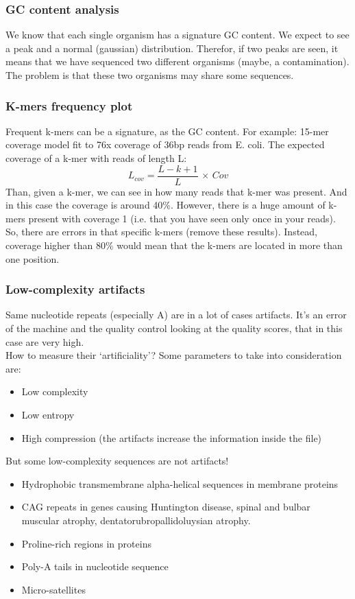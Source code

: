 \begin{description}
\subsubsection{GC content analysis}
We know that each single organism has a signature GC content. We expect to see a peak and a normal (gaussian) distribution. Therefor, if two peaks are seen, it means that we have sequenced two different organisms (maybe, a contamination). The problem is that these two organisms may share some sequences. 

\subsubsection{K-mers frequency plot}
Frequent k-mers can be a signature, as the GC content. For example: 15-mer coverage model fit to 76x coverage of 36bp reads from E. coli. 
The expected coverage of a k-mer with reads of length L:
\begin{equation}
L_{cov} = \frac{L-k+1}{L} \, \times \, Cov
\end{equation}
Than, given a k-mer, we can see in how many reads that k-mer was present. And in this case the coverage is around 40\%. However, there is a huge amount of k-mers present with coverage 1 (i.e. that you have seen only once in your reads). So, there are errors in that specific k-mers (remove these results). Instead, coverage higher than 80\% would mean that the k-mers are located in more than one position.

\subsubsection{Low-complexity artifacts}
Same nucleotide repeats (especially A) are in a lot of cases artifacts. It’s an error of the machine and the quality control looking at the quality scores, that in this case are very high.\\
How to measure their ‘artificiality’? Some parameters to take into consideration are:
\begin{itemize}
\item Low complexity 
\item Low entropy 
\item High compression (the artifacts increase the information inside the file) 
\end{itemize}
But some low-complexity sequences are not artifacts!
\begin{itemize}
\item Hydrophobic transmembrane alpha-helical sequences in membrane proteins 
\item CAG repeats in genes causing Huntington disease, spinal and bulbar muscular atrophy, dentatorubropallidoluysian atrophy. 
\item Proline-rich regions in proteins 
\item Poly-A tails in nucleotide sequence 
\item Micro-satellites 
\end{itemize}


\end{description}
